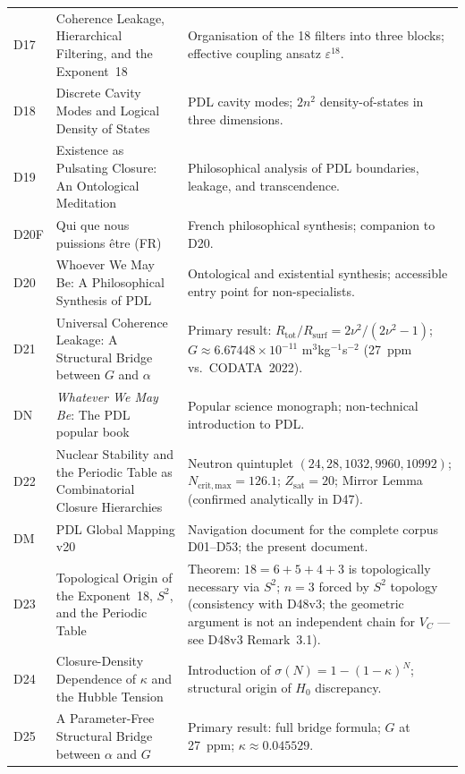 \documentclass[11pt,a4paper]{article}
\theoremstyle{plain}
\theoremstyle{definition}
\theoremstyle{remark}
\begin{document}
\begin{longtable}{L{1.3cm}L{3.8cm}L{8.0cm}}
D17 & Coherence Leakage, Hierarchical Filtering, and the Exponent~18~\cite{D17} & Organisation of the 18 filters into three blocks; effective coupling ansatz $\varepsilon^{18}$.\\[0.3em]
D18 & Discrete Cavity Modes and Logical Density of States~\cite{D18} & PDL cavity modes; $2n^2$ density-of-states in three dimensions.\\[0.3em]
D19 & Existence as Pulsating Closure: An Ontological Meditation~\cite{D19} & Philosophical analysis of PDL boundaries, leakage, and transcendence.\\[0.3em]
D20F & Qui que nous puissions \^etre (FR)~\cite{D20F} & French philosophical synthesis; companion to D20.\\[0.3em]
D20 & Whoever We May Be: A Philosophical Synthesis of PDL~\cite{D20} & Ontological and existential synthesis; accessible entry point for non-specialists.\\[0.3em]
D21 & Universal Coherence Leakage: A Structural Bridge between $G$ and $\alpha$~\cite{D21} & \textcolor{proofblue}{Primary result}: $R_{\mathrm{tot}}/R_{\mathrm{surf}} = 2\nu^2/(2\nu^2-1)$; $G \approx 6.67448\times 10^{-11}$ m$^3$kg$^{-1}$s$^{-2}$ (27~ppm vs.\ CODATA~2022).\\[0.3em]
DN & \emph{Whatever We May Be}: The PDL popular book~\cite{DN} & Popular science monograph; non-technical introduction to PDL.\\[0.3em]
D22 & Nuclear Stability and the Periodic Table as Combinatorial Closure Hierarchies~\cite{D22} & Neutron quintuplet $(24,28,1032,9960,10992)$; $N_{\mathrm{crit,max}}=126.1$; $Z_{\mathrm{sat}}=20$; Mirror Lemma (confirmed analytically in D47).\\[0.3em]
DM & PDL Global Mapping v20~\cite{DMapv10} & Navigation document for the complete corpus D01--D53; the present document.\\[0.3em]
D23 & Topological Origin of the Exponent~18, $S^2$, and the Periodic Table~\cite{D23} & \textcolor{proofblue}{Theorem}: $18=6+5+4+3$ is topologically necessary via $S^2$; $n=3$ forced by $S^2$ topology (consistency with D48v3; the geometric argument is not an independent chain for $V_C$ --- see D48v3 Remark~3.1).\\[0.3em]
D24 & Closure-Density Dependence of $\kappa$ and the Hubble Tension~\cite{D24} & Introduction of $\sigma(N)=1-(1-\kappa)^N$; structural origin of $H_0$ discrepancy.\\[0.3em]
D25 & A Parameter-Free Structural Bridge between $\alpha$ and $G$~\cite{D25} & \textcolor{proofblue}{Primary result}: full bridge formula; $G$ at 27~ppm; $\kappa\approx 0.045529$.\\[0.3em]

\end{longtable}
\end{document}
